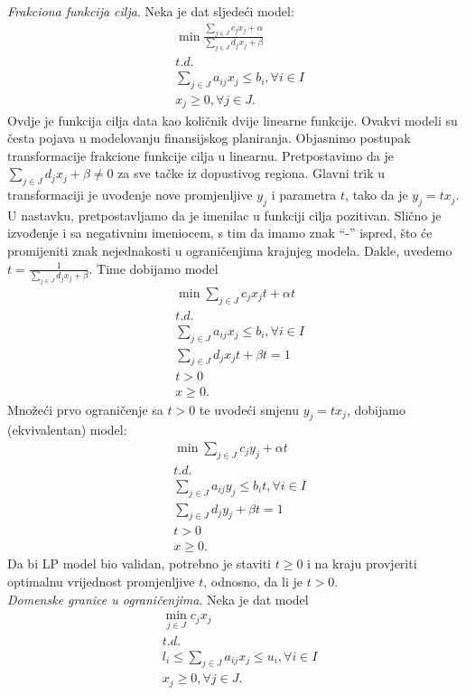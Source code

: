 \documentclass[a4paper, utf8, 11pt, colorlinks]{book}
\theoremstyle{definition}
\begin{document}
\emph{Frakciona funkcija cilja}. Neka je dat sljedeći model:
\begin{align*}
	& \min \frac{\sum_{j \in J} c_j x_j + \alpha}{ \sum_{j \in J} d_j x_j + \beta} \\
		& t.d. \nonumber \\
	& \sum_{j \in J} a_{ij} x_j \leq b_i,  \forall i \in I \\
	& x_j \geq 0, \forall j \in J.
\end{align*}
Ovdje je funkcija cilja data kao količnik dvije linearne funkcije. Ovakvi modeli su česta pojava u modelovanju finansijskog planiranja. Objasnimo postupak transformacije frakcione funkcije cilja u linearnu. Pretpostavimo da je $\sum_{j \in J}d_j x_j + \beta \neq 0$ za sve tačke iz dopustivog regiona. Glavni trik u transformaciji je uvođenje nove promjenljive $y_j$ i parametra $t$, tako da je $y_j = t x_j$. U nastavku, pretpostavljamo da je imenilac u funkciji cilja pozitivan. Slično je izvođenje i sa negativnim imeniocem, s tim da imamo znak ``-'' ispred, što će promijeniti znak nejednakosti u ograničenjima krajnjeg modela. Dakle, uvedemo $t = \frac{1}{\sum_{j \in J} d_j x_j + \beta }$. Time dobijamo model
\begin{align*}
	&\min \sum_{j \in J} c_j x_j t + \alpha t \\
	& t.d. \nonumber \\
	&\sum_{j \in J} a_{ij} x_j \leq b_i,  \forall i \in I \\
	& \sum_{j \in J} d_j x_j t + \beta t = 1 \\
	& t > 0 \\
	& x \geq 0.
\end{align*}
Množeći prvo ograničenje sa $t>0$ te uvodeći smjenu $y_j = t x_j$, dobijamo (ekvivalentan)  model:
\begin{align*}
	&\min \sum_{j \in J} c_j y_j + \alpha t \\
		& t.d. \nonumber \\
	& \sum_{j \in J} a_{ij} y_j \leq b_i t,  \forall i \in I \\
	& \sum_{j \in J} d_j y_j + \beta t = 1 \\
	& t > 0 \\
	& x \geq 0.
\end{align*}
Da bi LP model bio validan, potrebno je staviti $t \geq 0$ i na kraju provjeriti optimalnu vrijednost promjenljive $t$, odnosno, da li je $t>0$.   \\
\emph{Domenske granice u ograničenjima}. Neka je dat model
\begin{align*}
	&\min_{j \in J } c_j x_j \\
	& t.d. \nonumber \\
	& l_i \leq \sum_{j \in J} a_{ij} x_j \leq u_i, \forall i\in I \\
	& x_j \geq 0, \forall j \in J.
\end{align*} 
\end{document}
